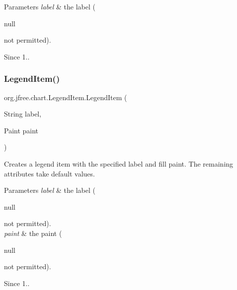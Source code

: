 \begin{DoxyParams}{Parameters}
{\em label} & the label (
\begin{DoxyCode}
null 
\end{DoxyCode}
 not permitted).\\
\hline
\end{DoxyParams}
\begin{DoxySince}{Since}
1.. 
\end{DoxySince}
\mbox{\label{classorg_1_1jfree_1_1chart_1_1_legend_item_ac576714c87364482d03cff0a2ffad9d9}} 
\subsubsection{\texorpdfstring{Legend\+Item()}{LegendItem()}\hspace{0.1cm}{\footnotesize\ttfamily [2/10]}}
{\footnotesize\ttfamily org.\+jfree.\+chart.\+Legend\+Item.\+Legend\+Item (\begin{DoxyParamCaption}\item[{String}]{label,  }\item[{Paint}]{paint }\end{DoxyParamCaption})}

Creates a legend item with the specified label and fill paint. The remaining attributes take default values.


\begin{DoxyParams}{Parameters}
{\em label} & the label (
\begin{DoxyCode}
null 
\end{DoxyCode}
 not permitted). \\
\hline
{\em paint} & the paint (
\begin{DoxyCode}
null 
\end{DoxyCode}
 not permitted).\\
\hline
\end{DoxyParams}
\begin{DoxySince}{Since}
1.. 
\end{DoxySince}
\mbox{\label{classorg_1_1jfree_1_1chart_1_1_legend_item_a7c7a2eb10ea3fcbc1761e6bbac9ce5d1}} 
